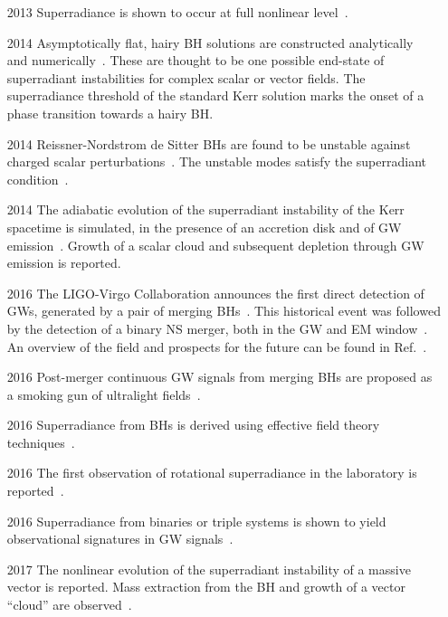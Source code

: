 \documentclass[11pt]{article}
\numberwithin{equation}{section} %
\begin{document}
\begin{itemize}[noitemsep]
\item[2013] Superradiance is shown to occur at full nonlinear level~\cite{East:2013mfa}.

\item[2014] Asymptotically flat, hairy BH solutions are constructed analytically~\cite{Hod:2012px} and numerically~\cite{Herdeiro:2014goa,Herdeiro:2015waa,Herdeiro:2016tmi}. These are thought to be one possible end-state of superradiant instabilities for complex scalar or vector fields. The superradiance threshold of the standard Kerr solution marks the onset of a phase transition towards a hairy BH. 

\item[2014] Reissner-Nordstrom de Sitter BHs are found to be unstable against charged scalar perturbations~\cite{Zhu:2014sya}. The unstable modes satisfy the superradiant condition~\cite{Konoplya:2014lha}. 

\item[2014] The adiabatic evolution of the superradiant instability of the Kerr spacetime is simulated, in the presence of an accretion disk and of GW emission~\cite{Brito:2014wla}. Growth of a scalar cloud and subsequent depletion through GW emission is reported. 

\item[2016] The LIGO-Virgo Collaboration announces the first direct detection of GWs, generated by a pair of merging 
BHs~\cite{Abbott:2016blz}. This historical event was followed by the detection of a binary NS merger, both in the GW 
and EM window~\cite{TheLIGOScientific:2017qsa}. An overview of the field and prospects for the future can be found in Ref.~\cite{Barack:2018yly}.

\item[2016] Post-merger continuous GW signals from merging BHs are proposed as a smoking gun of ultralight fields~\cite{Arvanitaki:2016qwi}. 

\item[2016] Superradiance from BHs is derived using effective field theory techniques~\cite{Endlich:2016jgc}.

\item[2016] The first observation of rotational superradiance in the laboratory is reported~\cite{Torres:2016iee}.

\item[2016] Superradiance from binaries or triple systems is shown to yield observational signatures in GW 
signals~\cite{Rosa:2016bli}.

\item[2017] The nonlinear evolution of the superradiant instability of a massive vector is reported. Mass extraction from the BH and growth of a vector ``cloud'' are observed~\cite{East:2017ovw}. 


\end{itemize}
\end{document}
